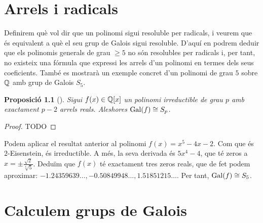 \documentclass[
]{book}
\newtheorem{proposition}{Proposició}[chapter]
\theoremstyle{definition}
\theoremstyle{definition}
\theoremstyle{definition}
\theoremstyle{definition}
\theoremstyle{remark}
\begin{document}
\hypertarget{arrels-i-radicals}{%
\chapter{Arrels i radicals}\label{arrels-i-radicals}}

Definirem què vol dir que un polinomi sigui resoluble per radicals, i veurem
que és equivalent a què el seu grup de Galois sigui resoluble. D'aquí en podrem
deduir que els polinomis generals de grau \(\geq 5\) no són resolubles per radicals i,
per tant, no existeix una fórmula que expressi les arrels d'un polinomi en termes
dels seus coeficients. També es mostrarà un exemple concret d'un polinomi de grau \(5\) sobre \(\mathbb{Q}\)
amb grup de Galois \(S_5\).

\begin{proposition}[]
Sigui \(f(x)\in \mathbb{Q}[x]\) un polinomi irreductible de grau \(p\) amb exactament \(p-2\) arrels reals. Aleshores \(\operatorname{Gal}(f)\cong S_p\).
\end{proposition}

\begin{proof}
TODO
\end{proof}

Podem aplicar el resultat anterior al polinomi \(f(x)=x^5-4x-2\). Com que és \(2\)-Eisenstein, és irreductible. A més, la seva derivada
és \(5x^4-4\), que té zeros a \(x=\pm\frac{\sqrt{2}}{\sqrt[4]{5}}\). Deduïm que \(f(x)\) té exactament tres zeros reals,
que de fet podem aproximar: \(-1.24359639\ldots,-0.50849948\ldots,1.51851215\ldots\). Per tant, \(\operatorname{Gal}(f)\cong S_5\).

\hypertarget{calculem-grups-de-galois}{%
\chapter{Calculem grups de Galois}\label{calculem-grups-de-galois}}

\nocite{*}

  
\end{document}
